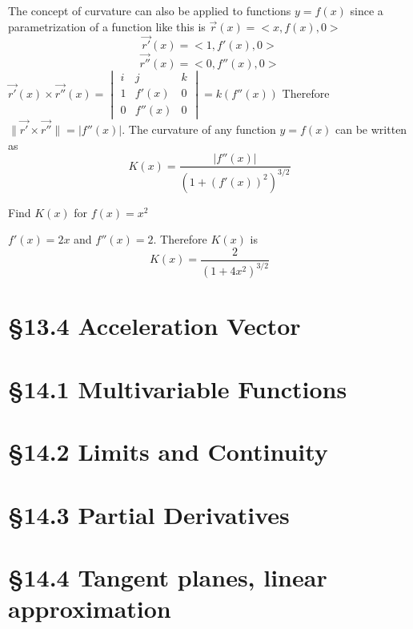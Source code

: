 \documentclass[12 pt]{article}
\begin{document}
        The concept of curvature can also be applied to functions $y=f(x)$ since a parametrization of a function like this is $\vec{r}(x)=<x,f(x),0>$
        $$\vec{r'}(x)=<1,f'(x),0>$$
        $$\vec{r''}(x)=<0,f''(x),0>$$
        $\vec{r'}(x)\times\vec{r''}(x)=
        \begin{vmatrix}
            i & j & k \\
            1 & f'(x) & 0 \\
            0 & f''(x) & 0
        \end{vmatrix}
        =k(f''(x))$
        Therefore $\parallel\vec{r'}\times\vec{r''}\parallel=\lvert f''(x)\rvert$. The curvature of any function $y=f(x)$ can be written as
        $$K(x)=\frac{\lvert f''(x)\rvert}{(1+(f'(x))^2)^{3/2}}$$
        \begin{exmp*}
            Find $K(x)$ for $f(x)=x^2$

            $f'(x)=2x$ and $f''(x)=2$. Therefore $K(x)$ is
            $$K(x)=\frac{2}{(1+4x^2)^{3/2}}$$
        \end{exmp*}
    \section{\S 13.4 Acceleration Vector}
    \section{\S 14.1 Multivariable Functions}
    \section{\S 14.2 Limits and Continuity}
    \section{\S 14.3 Partial Derivatives}
    \section{\S 14.4 Tangent planes, linear approximation}
\end{document}

